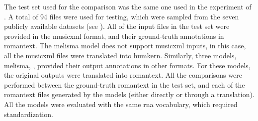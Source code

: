 
The test set used for the comparison was the same one used
in the experiment of
. A total of 94 files
were used for testing, which were sampled from the seven
publicly available datasets (see
). All of the input files
in the test set were provided in the \gls{musicxml} format,
and their ground-truth annotations in \gls{romantext}. The
\gls{melisma} model does not support \gls{musicxml} inputs,
in this case, all the \gls{musicxml} files were translated
into \gls{humkern}. Similarly, three models, \gls{melisma},
\textcite{chen2021attend, mcleod2021modular}, provided their
output annotations in other formats. For these models, the
original outputs were translated into \gls{romantext}. All
the comparisons were performed between the ground-truth
\gls{romantext} in the test set, and each of the
\gls{romantext} files generated by the models (either
directly or through a translation). All the models were
evaluated with the same \gls{rna} vocabulary, which required
standardization.


